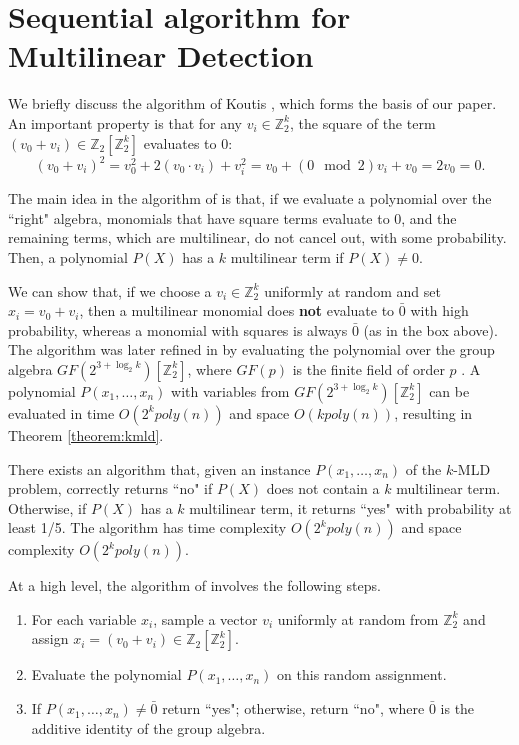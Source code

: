 \section{Sequential algorithm for Multilinear Detection} 
\label{sec:seq}
We briefly discuss the algorithm of Koutis \cite{koutis:icalp08}, which forms the basis of
our paper. An important property is that for any $v_i \in \mathbb{Z}_2^k$, the square of the term $(v_0 + v_i) \in \mathbb{Z}_2[\mathbb{Z}_2^k]$ evaluates to 0:
{\small
$$
(v_0 + v_i)^2 = v_0^2 + 2(v_0\cdot v_i) + v_i^2 = v_0 + (0\mod 2)v_i + v_0 = 2v_0 = 0.
$$}

The main idea in the algorithm of \cite{koutis:icalp08} is that, if we evaluate a polynomial 
over the ``right" algebra, monomials that have square terms evaluate to 0, and the remaining terms,
which are multilinear, do not cancel out, with some probability.
Then, a polynomial $P(X)$ has a $k$ multilinear term if $P(X) \neq 0$. 

We can show that, if we choose a $v_i \in \mathbb{Z}_2^k$ uniformly at random and set $x_i = v_0 + v_i$, then a multilinear monomial does \textbf{not} evaluate to $\bar 0$ with high probability, whereas a monomial with squares is always $\bar 0$ (as in the box above).
The algorithm was later refined in \cite{williams2009finding} by evaluating the polynomial over the group algebra $GF(2^{3 + \log_2k})[\mathbb{Z}_2^k]$, where $GF(p)$ is the finite field of order $p$ \cite{mullen2007finite}. A polynomial $P(x_1,\ldots,x_n)$ with variables from $GF(2^{3 + \log_2k})[\mathbb{Z}_2^k]$ can be evaluated in time $O(2^k poly(n))$ and space $O(kpoly(n))$, resulting in Theorem \ref{theorem:kmld}.

\begin{theorem}
\label{theorem:kmld}
There exists an algorithm that, given an instance $P(x_1,\ldots,x_n)$ of the \textsc{$k$-MLD} problem, correctly returns ``no" if $P(X)$ does not contain a $k$ multilinear term. Otherwise, if $P(X)$ has a $k$ multilinear term, it returns ``yes" with probability at least 1/5. 
The algorithm has time complexity $O(2^k poly(n))$ and space complexity $O(2^k poly(n))$.
\end{theorem}

At a high level, the algorithm of \cite{koutis:icalp08} involves the following steps.
\begin{enumerate}
\item For each variable $x_i$, sample a vector $v_i$ uniformly at random from $\mathbb{Z}_2^k$ and assign $x_i = (v_0 + v_i) \in \mathbb{Z}_2[\mathbb{Z}_2^k]$.
\item Evaluate the polynomial $P(x_1,\ldots,x_n)$ on this random assignment.
\item If $P(x_1,\ldots,x_n) \neq \bar{0}$ return ``yes"; otherwise, return ``no",
where $\bar{0}$ is the additive identity of the group algebra.
\end{enumerate}

